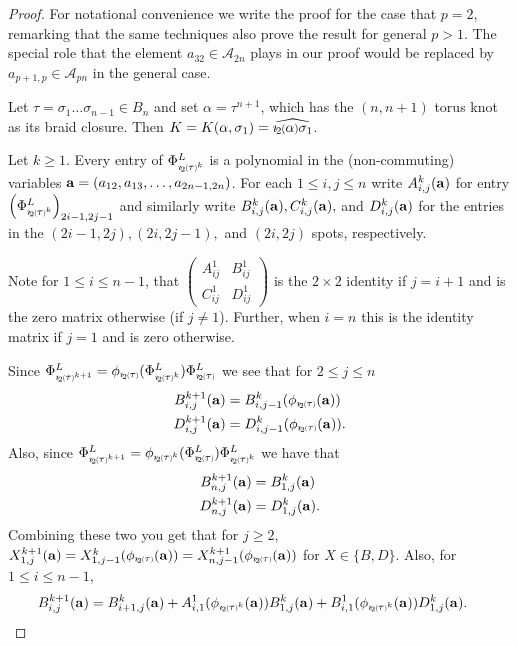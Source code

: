 \documentclass[11pt]{amsart}
\def\cl{\mathcal}
\def\s{{\sigma}}
\newcommand*{\smallp}[1]{\scalebox{.75}{\ensuremath#1}}
\newcommand*{\subsmallp}[1]{\scalebox{.5}{\ensuremath#1}}
\newcommand{\pp}[2][p]{\imath_{\hspace*{-1pt}#1}\hspace*{-.5pt}\smallp(#2\smallp)}
\newcommand{\subpp}[2][p]{\imath_{\hspace*{-1pt}#1}\hspace*{-.5pt}\subsmallp(#2\subsmallp)}
\newcommand{\al}[1]{\begin{align*}#1\end{align*}}
\theoremstyle{definition}
\begin{document}
\begin{proof}
For notational convenience we write the proof for the case that $p=2$, remarking that the same techniques also prove the result for general $p>1$. The special role that the element $a_{32}\in\cl A_{2n}$ plays in our proof would be replaced by $a_{p+1,p}\in\cl A_{pn}$ in the general case.

Let $\tau = \s_1\ldots\s_{n-1}\in B_n$ and set $\alpha = \tau^{n+1}$, which has the $(n,n+1)$ torus knot as its braid closure. Then $K=K(\alpha,\s_1) = \widehat{\pp[2]{\alpha}\s_1}$.

Let $k\ge1$. Every entry of $\Phi_{\subpp[2]\tau^k}^L$ is a polynomial in the (non-commuting) variables ${\bf a} = (a_{12},a_{13},\ldots,a_{2n-1,2n})$. For each $1\le i,j\le n$ write $A_{i,j}^k({\bf a})$ for entry $\left(\Phi_{\subpp[2]\tau^k}^L\right)_{2i-1,2j-1}$ and similarly write $B_{i,j}^k({\bf a}), C_{i,j}^k({\bf a}),$ and $D_{i,j}^k({\bf a})$ for the entries in the $(2i-1,2j), (2i,2j-1),$ and $(2i,2j)$ spots, respectively.

Note for $1\le i\le n-1$, that {\small $\begin{pmatrix}A_{ij}^1 & B_{ij}^1\\ C_{ij}^1 & D_{ij}^1\end{pmatrix}$} is the $2\times 2$ identity if $j=i+1$ and is the zero matrix otherwise (if $j\ne1$). Further, when $i=n$ this is the identity matrix if $j=1$ and is zero otherwise.

Since $\Phi_{\subpp[2]\tau^{k+1}}^L = \phi_{\subpp[2]\tau}(\Phi_{\subpp[2]\tau^{k}}^L)\Phi_{\subpp[2]\tau}^L$ we see that for $2\le j\le n$
  \al{
    B_{i,j}^{k+1}({\bf a})  &= B_{i,j-1}^k(\phi_{\subpp[2]\tau}({\bf a})) \\
    D_{i,j}^{k+1}({\bf a})  &= D_{i,j-1}^k(\phi_{\subpp[2]\tau}({\bf a})).
  }
Also, since $\Phi_{\subpp[2]\tau^{k+1}}^L = \phi_{\subpp[2]\tau^k}(\Phi_{\subpp[2]\tau}^L)\Phi_{\subpp[2]\tau^k}^L$ we have that
  \al{
    B_{n,j}^{k+1}({\bf a})  &= B_{1,j}^k({\bf a}) \\
    D_{n,j}^{k+1}({\bf a})  &= D_{1,j}^k({\bf a}).
  }
Combining these two you get that for $j\ge2$, $X_{1,j}^{k+1}({\bf a}) = X_{1,j-1}^k(\phi_{\subpp[2]\tau}({\bf a})) = X_{n,j-1}^{k+1}(\phi_{\subpp[2]\tau}({\bf a}))$ for $X\in\{B,D\}$.
Also, for $1\le i\le n-1$,
  \begin{align}
    B_{i,j}^{k+1}({\bf a})  &= B_{i+1,j}^k({\bf a})+A_{i,1}^1(\phi_{\subpp[2]\tau^k}({\bf a}))B_{1,j}^k({\bf a})+B_{i,1}^1(\phi_{\subpp[2]\tau^k}({\bf a}))D_{1,j}^k({\bf a}) \label{eqn2}.
  \end{align}


\end{proof}
\end{document}
